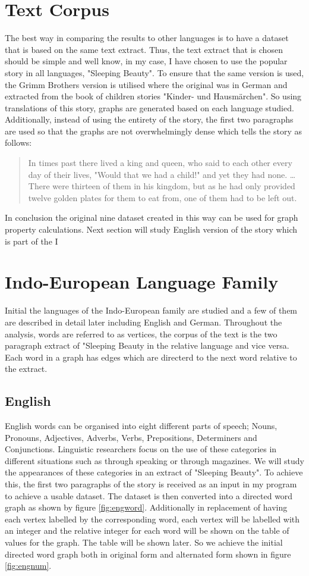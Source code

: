 \section{Text Corpus}
The best way in comparing the results to other languages is to have a dataset that is based on the same text extract. Thus, the text extract that is chosen should be simple and well know, in my case, I have chosen to use the popular story in all languages, "Sleeping Beauty". To ensure that the same version is used, the Grimm Brothers version is utilised where the original was in German and extracted from the book of children stories "Kinder- und Hausmärchen"\cite{grimm1857kinder}. So using translations of this story, graphs are generated based on each language studied.  Additionally, instead of using the entirety of the story, the first two paragraphs are used so that the graphs are not overwhelmingly dense which tells the story as follows:
\begin{quote}
In times past there lived a king and queen, who said to each other every day of their lives, "Would that we had a child!" and yet they had none. \dots There were thirteen of them in his kingdom, but as he had only provided twelve golden plates for them to eat from, one of them had to be left out.
\end{quote}
In conclusion the original nine dataset created in this way can be used for graph property calculations. Next section will study English version of the story which is part of the I

\section{Indo-European Language Family}
Initial the languages of the Indo-European family are studied and a few of them are described in detail later including English and German. Throughout the analysis, words are referred to as vertices, the corpus of the text is the two paragraph extract of "Sleeping Beauty in the relative language and vice versa. Each word in a graph has edges which are directerd to the next word relative to the extract. 
\subsection{English}
English words can be organised into eight different parts of speech; Nouns, Pronouns, Adjectives, Adverbs, Verbs, Prepositions, Determiners and Conjunctions. Linguistic researchers focus on the use of these categories in different situations such as through speaking or through magazines\cite{khaisaeng2017study}. We will study the appearances of these categories in an extract of "Sleeping Beauty". To achieve this, the first two paragraphs of the story is received as an input in my program to achieve a usable dataset. The dataset is then converted into a directed word graph as shown by figure \ref{fig:engword}. Additionally in replacement of having each vertex labelled by the corresponding word, each vertex will be labelled with an integer and the relative integer for each word will be shown on the table of values for the graph. The table will be shown later. So we achieve the initial directed word graph both in original form and alternated form shown in figure \ref{fig:engnum}.

